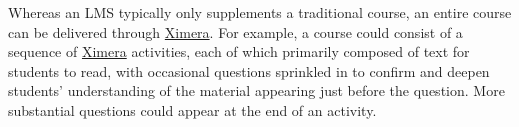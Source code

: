 \documentclass{ximera}
\begin{document}
Whereas an LMS typically only supplements a traditional course,
an entire course can be delivered through
\href{http://ximera.osu.edu}{\sf Ximera}.
For example, a course could consist of a sequence
of \href{http://ximera.osu.edu}{\sf Ximera}
activities, each of which primarily composed of text
for students to read, with occasional 
questions sprinkled in to confirm and deepen students'
understanding of the material appearing just before the question.
More substantial questions could appear at the end of an activity.
\end{document}
